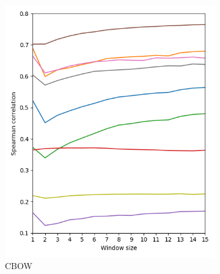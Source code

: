 \documentclass[11pt,a4paper]{article}
\begin{document}
    \begin{figure}[th]
        \begin{subfigure}[b]{\columnwidth}
        \includegraphics[width=\columnwidth]{figs/similarities_fasttext_enwiki-20170501-clean_cbow-300d-min500_eval.png}
        \caption{CBOW}
        \end{subfigure}
        \begin{subfigure}[b]{\columnwidth}

\end{subfigure}
\end{figure}
\end{document}
